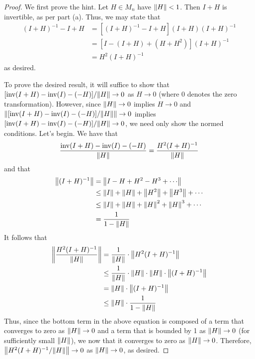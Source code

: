 \documentclass[../psets.tex]{subfiles}
\begin{document}
\begin{enumerate}
\begin{enumerate}
\begin{proof}
            We first prove the hint. Let $H\in M_n$ have $\norm{H}<1$. Then $I+H$ is invertible, as per part (a). Thus, we may state that
            \begin{align*}
                (I+H)^{-1}-I+H &= [(I+H)^{-1}-I+H](I+H)(I+H)^{-1}\\
                &= [I-(I+H)+(H+H^2)](I+H)^{-1}\\
                &= H^2(I+H)^{-1}
            \end{align*}
            as desired.\par
            To prove the desired result, it will suffice to show that $[\operatorname{inv}(I+H)-\operatorname{inv}(I)-(-H)]/\norm{H}\to 0$ as $H\to 0$ (where 0 denotes the zero transformation). However, since $\norm{H}\to 0$ implies $H\to 0$ and $\norm{[\operatorname{inv}(I+H)-\operatorname{inv}(I)-(-H)]/\norm{H}}\to 0$ implies $[\operatorname{inv}(I+H)-\operatorname{inv}(I)-(-H)]/\norm{H}\to 0$, we need only show the normed conditions. Let's begin. We have that
            \begin{equation*}
                \frac{\operatorname{inv}(I+H)-\operatorname{inv}(I)-(-H)}{\norm{H}} = \frac{H^2(I+H)^{-1}}{\norm{H}}
            \end{equation*}
            and that
            \begin{align*}
                \norm{(I+H)^{-1}} &= \norm{I-H+H^2-H^3+\cdots}\\
                &\leq \norm{I}+\norm{H}+\norm{H^2}+\norm{H^3}+\cdots\\
                &\leq \norm{I}+\norm{H}+\norm{H}^2+\norm{H}^3+\cdots\\
                &= \frac{1}{1-\norm{H}}
            \end{align*}
            It follows that
            \begin{align*}
                \norm{\frac{H^2(I+H)^{-1}}{\norm{H}}} &= \frac{1}{\norm{H}}\cdot\norm{H^2(I+H)^{-1}}\\
                &\leq \frac{1}{\norm{H}}\cdot\norm{H}\cdot\norm{H}\cdot\norm{(I+H)^{-1}}\\
                &= \norm{H}\cdot\norm{(I+H)^{-1}}\\
                &\leq \norm{H}\cdot\frac{1}{1-\norm{H}}
            \end{align*}
            Thus, since the bottom term in the above equation is composed of a term that converges to zero as $\norm{H}\to 0$ and a term that is bounded by 1 as $\norm{H}\to 0$ (for sufficiently small $\norm{H}$), we now that it converges to zero as $\norm{H}\to 0$. Therefore, $\norm{H^2(I+H)^{-1}/\norm{H}}\to 0$ as $\norm{H}\to 0$, as desired.

\end{proof}
\end{enumerate}
\end{enumerate}
\end{document}

